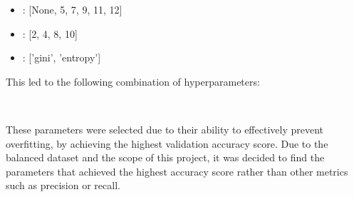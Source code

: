 \begin{center}
    \begin{minipage}{3in}

\begin{itemize}
    \item {}: [None, 5, 7, 9, 11, 12]
    \item {}: [2, 4, 8, 10]
    \item {}: ['gini', 'entropy'] \newline
\end{itemize}
            \end{minipage}
\end{center}


This led to the following combination of hyperparameters:\newline
\begin{tcolorbox}[colback=white,
                  arc=0pt,
                outer=0pt]
\centering {} \, \,  \, \, \\
   \end{tcolorbox}

These parameters were selected due to their ability to effectively prevent overfitting, by achieving the highest validation accuracy score.
Due to the balanced dataset and the scope of this project, it was decided to find the parameters that achieved the highest accuracy score rather than other metrics such as precision or recall.
